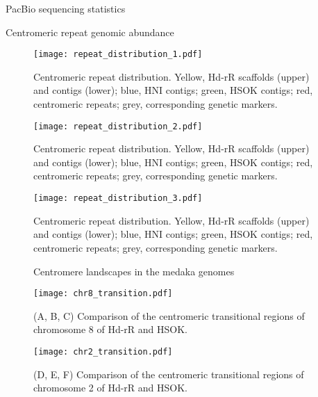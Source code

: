 \begin{table}[htbp]
  \centering
  \caption{PacBio sequencing statistics}
  
  \label{sequencing_stats}
\end{table}

\begin{table}[htbp]
  \centering
  \caption{Centromeric repeat genomic abundance}
  
  \label{centromeric_repeat_genomic_abundance}
\end{table}

\begin{figure}[p]
  \centering
  \texttt{[image: repeat\_distribution\_1.pdf]}
  \caption{
    Centromeric repeat distribution. Yellow, Hd-rR scaffolds (upper) and contigs (lower); blue, HNI contigs; green, HSOK contigs; red, centromeric repeats; grey, corresponding genetic markers.
  }
  \label{fig:repeat_distribution}
\end{figure}

\addtocounter{figure}{-1}
\begin{figure}[p]
  \centering
  \texttt{[image: repeat\_distribution\_2.pdf]}
  \caption{
    Centromeric repeat distribution. Yellow, Hd-rR scaffolds (upper) and contigs (lower); blue, HNI contigs; green, HSOK contigs; red, centromeric repeats; grey, corresponding genetic markers.
  }
  \label{fig:repeat_distribution}
\end{figure}

\addtocounter{figure}{-1}
\begin{figure}[p]
  \centering
  \texttt{[image: repeat\_distribution\_3.pdf]}
  \caption{
    Centromeric repeat distribution. Yellow, Hd-rR scaffolds (upper) and contigs (lower); blue, HNI contigs; green, HSOK contigs; red, centromeric repeats; grey, corresponding genetic markers.
  }
  \label{fig:repeat_distribution}
\end{figure}



\begin{figure}[p]
  \centering
  \caption{
    Centromere landscapes in the medaka genomes
  }
  \label{centromere_landscape}
\end{figure}

\begin{figure}[p]
  \centering
  \texttt{[image: chr8\_transition.pdf]}
  \caption{
    (A, B, C) Comparison of the centromeric transitional regions of chromosome 8 of Hd-rR and HSOK.
  }
  \label{other_chroms_transition}
\end{figure}

\addtocounter{figure}{-1}
\begin{figure}[p]
  \centering
  \texttt{[image: chr2\_transition.pdf]}
  \caption{
    (D, E, F) Comparison of the centromeric transitional regions of chromosome 2 of Hd-rR and HSOK.
  }
\end{figure}
